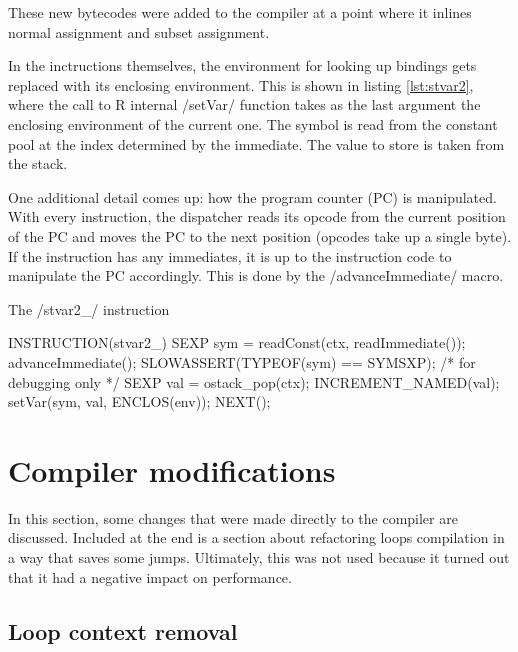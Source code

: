 These new bytecodes were added to the compiler at a point where it inlines normal assignment and subset assignment.

In the inctructions themselves, the environment for looking up bindings gets replaced with its enclosing environment. This is shown in listing \ref{lst:stvar2}, where the call to R internal \cinline/setVar/ function takes as the last argument the enclosing environment of the current one. The symbol is read from the constant pool at the index determined by the immediate. The value to store is taken from the stack.

One additional detail comes up: how the program counter (PC) is manipulated. With every instruction, the dispatcher reads its opcode from the current position of the PC and moves the PC to the next position (opcodes take up a single byte). If the instruction has any immediates, it is up to the instruction code to manipulate the PC accordingly. This is done by the \cinline/advanceImmediate/ macro.

\begin{listing}[htbp]
  \caption{\label{lst:stvar2}The \cinline/stvar2_/ instruction}
  \begin{ccode}
INSTRUCTION(stvar2_) {
    SEXP sym = readConst(ctx, readImmediate());
    advanceImmediate();
    SLOWASSERT(TYPEOF(sym) == SYMSXP);  /* for debugging only */
    SEXP val = ostack_pop(ctx);
    INCREMENT_NAMED(val);
    setVar(sym, val, ENCLOS(env));
    NEXT();
}
  \end{ccode}
\end{listing}


\section{Compiler modifications}

In this section, some changes that were made directly to the compiler are discussed. Included at the end is a section about refactoring loops compilation in a way that saves some jumps. Ultimately, this was not used because it turned out that it had a negative impact on performance.


\subsection{Loop context removal}

